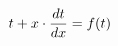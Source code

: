 \documentclass[preview]{standalone}
\begin{document}
\begin{align*}
\special{dvisvgm:raw <g id='unique000'>}t + x \cdot \frac{dt}{dx} = f(t)\special{dvisvgm:raw </g>}
\end{align*}
\end{document}
